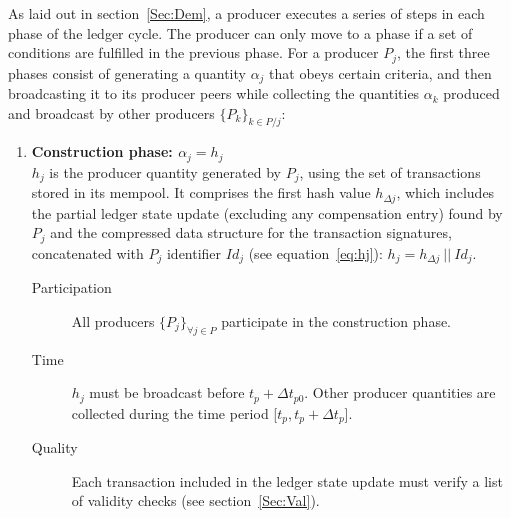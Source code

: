 As laid out in section~\ref{Sec:Dem}, a producer executes a series of steps in each phase of the ledger cycle. The producer can only move to a phase if a set of conditions are fulfilled in the previous phase. For a producer $P_j$, the first three phases consist of generating a quantity $\alpha_j$ that obeys certain criteria, and then broadcasting it to its producer peers while collecting the quantities $\alpha_k$ produced and broadcast by other producers $\{P_k\}_{k\in P/j}$:
\begin{enumerate}
\item \textbf{Construction phase: $\alpha_j = h_j$} \\
 $h_j$ is the producer quantity generated by $P_j$, using the set of transactions stored in its mempool. It comprises the first hash value $h_{\Delta j}$, which includes the partial ledger state update (excluding any compensation entry) found by $P_j$ and the compressed data structure for the transaction signatures, concatenated with $P_j$ identifier $Id_j$ (see equation~\ref{eq:hj}): $h_j = h_{\Delta j}~||~Id_j$. 
\begin{description}
\item[Participation] All producers $\{P_j\}_{\forall j \in P}$ participate in the construction phase. 
\item[Time] $h_j$ must be broadcast before $t_p + \Delta t_{p0}$. Other producer quantities are collected during the time period [$t_p, t_p + \Delta t_{p}$].
\item[Quality] Each transaction included in the ledger state update must verify a list of validity checks (see section~\ref{Sec:Val}). 
\end{description}


\end{enumerate}
